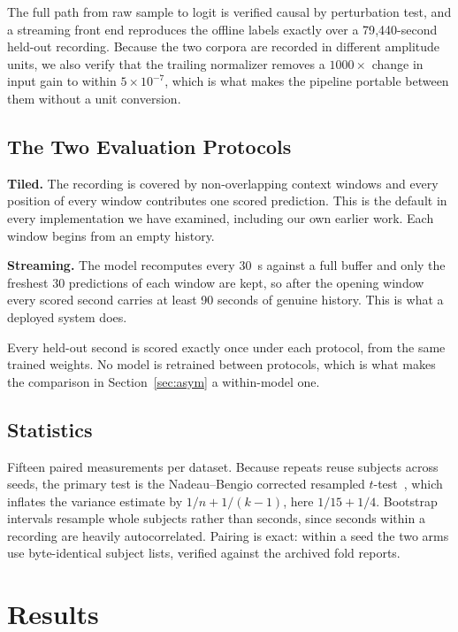 \documentclass[conference]{IEEEtran}
\begin{document}
The full path from raw sample to logit is verified causal by perturbation test, and a streaming
front end reproduces the offline labels exactly over a 79{,}440-second held-out recording. Because
the two corpora are recorded in different amplitude units, we also verify that the trailing
normalizer removes a $1000\times$ change in input gain to within $5\times10^{-7}$, which is what
makes the pipeline portable between them without a unit conversion.

\subsection{The Two Evaluation Protocols}
\label{sec:protocol}

\textbf{Tiled.} The recording is covered by non-overlapping context windows and every position of
every window contributes one scored prediction. This is the default in every implementation we
have examined, including our own earlier work. Each window begins from an empty history.

\textbf{Streaming.} The model recomputes every 30~s against a full buffer and only the freshest 30
predictions of each window are kept, so after the opening window every scored second carries at
least 90 seconds of genuine history. This is what a deployed system does.

Every held-out second is scored exactly once under each protocol, from the same trained weights.
No model is retrained between protocols, which is what makes the comparison in
Section~\ref{sec:asym} a within-model one.

\subsection{Statistics}

Fifteen paired measurements per dataset. Because repeats reuse subjects across seeds, the primary
test is the Nadeau--Bengio corrected resampled $t$-test~\cite{nadeau}, which inflates the variance
estimate by $1/n + 1/(k-1)$, here $1/15 + 1/4$. Bootstrap intervals resample whole subjects rather
than seconds, since seconds within a recording are heavily autocorrelated. Pairing is exact: within
a seed the two arms use byte-identical subject lists, verified against the archived fold reports.

\section{Results}
\end{document}
